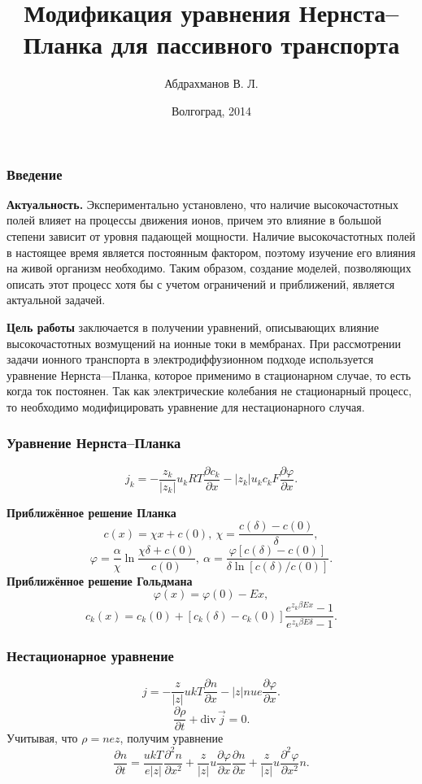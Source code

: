 \documentclass[10pt]{beamer}
\date{Волгоград, 2014}
\title{Модификация уравнения Нернста--Планка для пассивного транспорта}
\author{Абдрахманов В. Л.}
\newcommand{\pder}[2] {\frac{\partial #1}{\partial #2}}
\newcommand{\ppder}[2]{\frac{\partial^2 #1}{\partial {#2}^2}}
\newcommand{\abs}[1]{\left| #1 \right|}
\renewcommand{\phi}{\varphi}
\newcommand{\divergence}{\mathrm{div\,}}
\begin{document}
  \frame{\titlepage}
  \begin{frame}
    \frametitle{Введение}

    \textbf{Актуальность.} Экспериментально установлено, что наличие
    высокочастотных полей влияет на процессы движения ионов, причем это
    влияние в большой степени зависит от уровня падающей мощности.
    Наличие высокочастотных полей в настоящее время является постоянным
    фактором, поэтому изучение его влияния на живой организм необходимо.
    Таким образом, создание моделей, позволяющих описать этот процесс
    хотя бы с учетом ограничений и приближений, является актуальной
    задачей.

    \textbf{Цель работы} заключается в получении уравнений, описывающих
влияние высокочастотных возмущений на ионные токи в мембранах. При
рассмотрении задачи ионного транспорта в электродиффузионном подходе
используется уравнение Нернста—Планка, которое применимо в
стационарном случае, то есть когда ток постоянен. Так как электрические
колебания не стационарный процесс, то необходимо модифицировать
уравнение для нестационарного случая.
\end{frame}
  \begin{frame}
    \frametitle{Уравнение Нернста--Планка}
    \[
        j_k = -\frac{z_k}{\abs{z_k}}u_kRT\pder{c_k}{x} -
        \abs{z_k}u_kc_kF\pder{\phi}{x}.
        \label{eq:nernst-plank}
    \]

      \textbf{Приближённое решение Планка}
      \[
          c(x) = \chi x + c(0),\ \chi = \frac{c(\delta)-c(0)}{\delta},
      \]
      \[
          \phi = \frac{\alpha}{\chi}\ln\frac{\chi\delta + c(0)}{c(0)},
          \ \alpha = \frac{\phi[c(\delta) - c(0)]}
          {\delta\ln[c(\delta) / c(0)]}.
      \]
      \textbf{Приближённое решение Гольдмана}
      \[
          \phi(x) = \phi(0) - Ex,
      \]
      \[
          c_k(x) = c_k(0) + [c_k(\delta) - c_k(0)]
          \frac{e^{z_k\beta Ex} - 1}{e^{z_k\beta E\delta} - 1}.
      \]
  \end{frame}
  \begin{frame}
      \frametitle{Нестационарное уравнение}
        \[
          j = -\frac{z}{|z|}ukT\pder{n}{x} - |z|nue\pder{\phi}{x}.
        \]
        \[
            \pder{\rho}{t} + \divergence\vec{j} = 0.
        \]
        Учитывая, что \( \rho = nez \), получим уравнение
        \[
            \pder{n}{t} = \frac{ukT}{e|z|}\ppder{n}{x} +
            \frac{z}{|z|}u\pder{\phi}{x}\pder{n}{x} +
            \frac{z}{|z|}u\ppder{\phi}{x}n.
        \]
  \end{frame}
\end{document}
